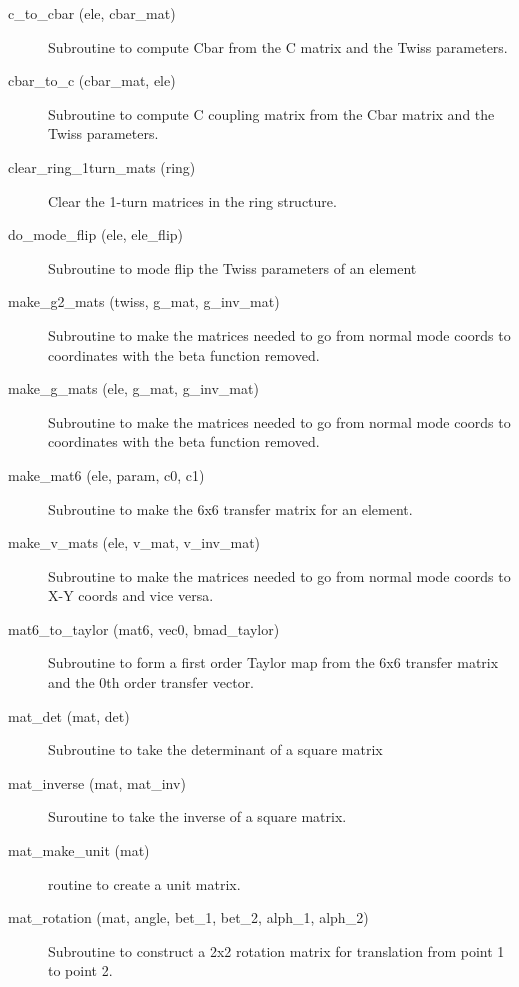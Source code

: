 \begin{description}

\item[c\_to\_cbar (ele, cbar\_mat)] \Newline
Subroutine to compute Cbar from the C matrix and the Twiss parameters. 

\item[cbar\_to\_c (cbar\_mat, ele)] \Newline
Subroutine to compute C coupling matrix from the Cbar matrix and the Twiss parameters. 

\item[clear\_ring\_1turn\_mats (ring)] \Newline
Clear the 1-turn matrices in the ring structure. 

\item[do\_mode\_flip (ele, ele\_flip)] \Newline
Subroutine to mode flip the Twiss parameters of an element 

\item[make\_g2\_mats (twiss, g\_mat, g\_inv\_mat)] \Newline
Subroutine to make the matrices needed to go from normal mode coords to 
coordinates with the beta function removed. 

\item[make\_g\_mats (ele, g\_mat, g\_inv\_mat)] \Newline
Subroutine to make the matrices needed to go from normal mode coords to 
coordinates with the beta function removed. 

\item[make\_mat6 (ele, param, c0, c1)] \Newline
Subroutine to make the 6x6 transfer matrix for an element. 

\item[make\_v\_mats (ele, v\_mat, v\_inv\_mat)] \Newline
Subroutine to make the matrices needed to go from normal mode coords to X-Y 
coords and vice versa. 

\item[mat6\_to\_taylor (mat6, vec0, bmad\_taylor)] \Newline
Subroutine to form a first order Taylor map from the 6x6 transfer matrix 
and the 0th order transfer vector. 

\item[mat\_det (mat, det)] \Newline 
     Subroutine to take the determinant of a square matrix

\item[mat\_inverse (mat, mat\_inv)] \Newline
Suroutine to take the inverse of a square matrix. 

\item[mat\_make\_unit (mat)] \Newline 
     routine to create a unit matrix.

\item[mat\_rotation (mat, angle, bet\_1, bet\_2, alph\_1, alph\_2)] \Newline 
     Subroutine to construct a 2x2 rotation matrix for translation from
     point 1 to point 2.


\end{description}
